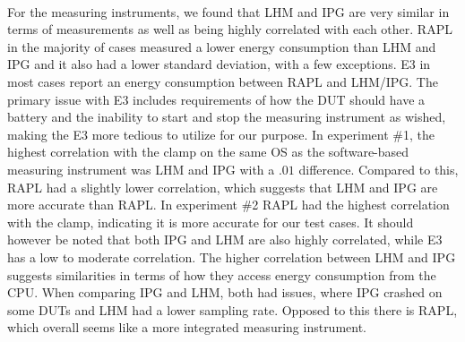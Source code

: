 \paragraph*{}
For the measuring instruments, we found that LHM and IPG are very similar in terms of measurements as well as being highly correlated with each other. RAPL in the majority of cases measured a lower energy consumption than LHM and IPG and it also had a lower standard deviation, with a few exceptions. E3 in most cases report an energy consumption between RAPL and LHM/IPG. The primary issue with E3 includes requirements of how the DUT should have a battery and the inability to start and stop the measuring instrument as wished, making the E3 more tedious to utilize for our purpose. In experiment \#1, the highest correlation with the clamp on the same OS as the software-based measuring instrument was LHM and IPG with a $.01$ difference. Compared to this, RAPL had a slightly lower correlation, which suggests that LHM and IPG are more accurate than RAPL. In experiment \#2 RAPL had the highest correlation with the clamp, indicating it is more accurate for our test cases. It should however be noted that both IPG and LHM are also highly correlated, while E3 has a low to moderate correlation. The higher correlation between LHM and IPG suggests similarities in terms of how they access energy consumption from the CPU. When comparing IPG and LHM, both had issues, where IPG crashed on some DUTs and LHM had a lower sampling rate. Opposed to this there is RAPL, which overall seems like a more integrated measuring instrument.
